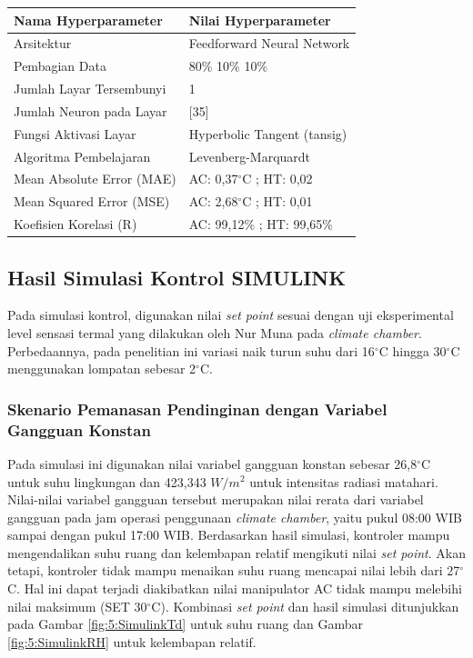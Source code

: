 \documentclass[a4paper,10pt]{article}
\makeatletter
\newenvironment{body}{\begin{multicols}{2}}{\end{multicols}}
\renewenvironment{table}
{\def\@captype{table}%
	\captionsetup{format=plain,labelsep=newline,font=footnotesize,textfont=sc,justification=centering}%
	\fontsize{8}{8}\selectfont
}
{}
\makeatother
\begin{document}
\begin{body}
		\begin{table}
			\centering
			\caption{Tabel Rancangan Kontroler JST (\textit{NN Inverse Model})}
			\label{tbl:5:NNControl}
			\begin{tabularx}{\linewidth}{XX}\toprule
				\textbf{Nama Hyperparameter} & \textbf{Nilai Hyperparameter} \\ \toprule
				Arsitektur & Feedforward Neural Network \\ \midrule
				Pembagian Data & 80\% 10\% 10\% \\ \midrule 
				Jumlah Layar Tersembunyi & 1 \\ \midrule
				Jumlah Neuron pada Layar & [35] \\ \midrule
				Fungsi Aktivasi Layar & Hyperbolic Tangent (tansig) \\ \midrule
				Algoritma Pembelajaran & Levenberg-Marquardt \\ \midrule
				Mean Absolute Error (MAE) & AC: 0,37$^\circ$C ; HT: 0,02\\ \midrule
				Mean Squared Error (MSE) & AC: 2,68$^\circ$C ; HT: 0,01\\ \midrule
				Koefisien Korelasi (R) & AC: 99,12\% ; HT: 99,65\% \\ \bottomrule
			\end{tabularx}
		\end{table}
	
		\vspace{2mm}
				
		\subsection{Hasil Simulasi Kontrol SIMULINK}
		
		Pada simulasi kontrol, digunakan nilai \textit{set point} sesuai dengan uji eksperimental level sensasi termal yang dilakukan oleh Nur Muna pada \textit{climate chamber}\cite{skripsiMuna}. Perbedaannya, pada penelitian ini variasi naik turun suhu dari 16$^\circ$C hingga 30$^\circ$C menggunakan lompatan sebesar 2$^\circ$C.
		
		\subsubsection{Skenario Pemanasan Pendinginan dengan Variabel Gangguan Konstan}
		
		Pada simulasi ini digunakan nilai variabel gangguan konstan sebesar 26,8$^\circ$C untuk suhu lingkungan dan 423,343 $W/m^2$ untuk intensitas radiasi matahari. Nilai-nilai variabel gangguan tersebut merupakan nilai rerata dari variabel gangguan pada jam operasi penggunaan \textit{climate chamber}, yaitu pukul 08:00 WIB sampai dengan pukul 17:00 WIB. Berdasarkan hasil simulasi, kontroler mampu mengendalikan suhu ruang dan kelembapan relatif mengikuti nilai \textit{set point}. Akan tetapi, kontroler tidak mampu menaikan suhu ruang mencapai nilai lebih dari 27$^\circ$C. Hal ini dapat terjadi diakibatkan nilai manipulator AC tidak mampu melebihi nilai maksimum (SET 30$^\circ$C). Kombinasi \textit{set point} dan hasil simulasi ditunjukkan pada Gambar \ref{fig:5:SimulinkTd} untuk suhu ruang dan Gambar \ref{fig:5:SimulinkRH} untuk kelembapan relatif.
		

\end{body}
\end{document}
